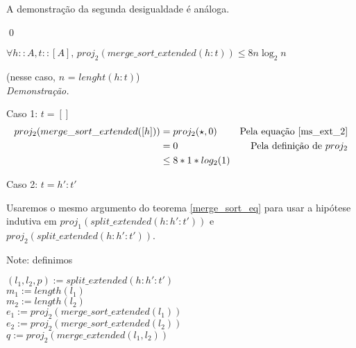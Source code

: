 \documentclass[12pt, oneside, a4paper,english,brazil]{abntex2}
\begin{document}
A demonstra\c{c}\~ao da segunda desigualdade \'e an\'aloga.

\qed

\begin{teorema}
  $\forall h :: A, t :: [A], \, proj_{2}(merge\_sort\_extended(h : t)) \le 8 n \log_{2}n$
\end{teorema}
(nesse caso, $n$ = $lenght(h : t)$)\\

\noindent \textit{Demonstra\c{c}\~ao.}

Caso 1: $t = []$
\begin{align*}
  proj_{2}(merge\_sort\_extended([h])) &= proj_{2}(\star, 0) &\text{Pela equa\c{c}\~ao \ref{ms_ext_2}}\\
                                      &= 0 &\text{Pela defini\c{c}\~ao de $proj_{2}$}\\
  &\le 8 * 1 * log_{2}(1)
\end{align*}

Caso 2: $t = h' : t'$

Usaremos o mesmo argumento do teorema \ref{merge_sort_eq} para usar a hip\'otese indutiva em $proj_{1}(split\_extended(h : h' : t'))$ e $proj_{2}(split\_extended(h : h' : t'))$.

Note: definimos
\begin{center}
  $(l_{1}, l_{2}, p) := split\_extended(h : h' : t')$\\
  $m_{1} := length(l_{1})$\\
  $m_{2} := length(l_{2})$\\
  $e_{1} := proj_{2}(merge\_sort\_extended(l_{1}))$\\
  $e_{2} := proj_{2}(merge\_sort\_extended(l_{2}))$\\
  $q := proj_{2}(merge\_extended(l_{1}, l_{2}))$\\
\end{center}
\end{document}
